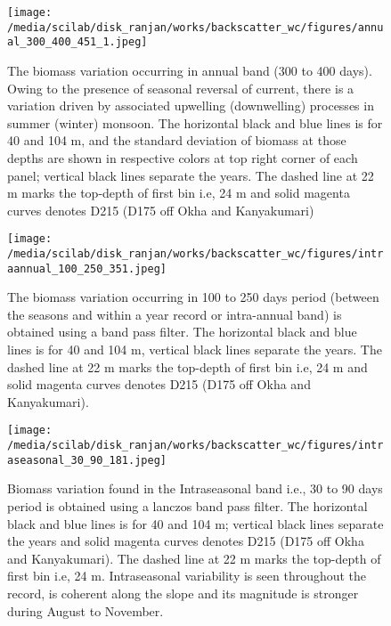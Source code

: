 \documentclass{article}
\begin{document}
\begin{figure}[htbp]
	\centering
	\texttt{[image: /media/scilab/disk\_ranjan/works/backscatter\_wc/figures/annual\_300\_400\_451\_1.jpeg]} 
	\captionsetup{justification=justified,font=footnotesize,skip=0.05\baselineskip,width=\textwidth}
	\caption{The biomass variation occurring in annual band (300 to 400 days). Owing to the presence of seasonal reversal of current, there is a variation driven by associated upwelling (downwelling) processes in summer (winter) monsoon. The horizontal black and blue lines is for 40 and 104 m, and the standard deviation of biomass at those depths are shown in respective colors at top right corner of each panel; vertical black lines separate the years. The dashed line at 22 m marks the top-depth of first bin i.e, 24 m and solid magenta curves denotes D215 (D175 off Okha and Kanyakumari)}
	\label{fig:annual}
\end{figure}



\begin{figure}[htbp]
	\centering
	\texttt{[image: /media/scilab/disk\_ranjan/works/backscatter\_wc/figures/intraannual\_100\_250\_351.jpeg]} 
	\captionsetup{justification=justified,font=footnotesize,skip=0.05\baselineskip,width=\textwidth}
	\caption{The biomass variation occurring in 100 to 250 days period (between the seasons and within a year record or intra-annual band) is obtained using a band pass filter. The horizontal black and blue lines is for 40 and 104 m,
	vertical black lines separate the years. The dashed line at 22 m marks the top-depth of first bin i.e, 24 m and solid magenta curves denotes D215 (D175 off Okha and Kanyakumari). }
	\label{fig:intraannual}
\end{figure}

\begin{figure}[htbp]
	\centering
	\texttt{[image: /media/scilab/disk\_ranjan/works/backscatter\_wc/figures/intraseasonal\_30\_90\_181.jpeg]} 
	\captionsetup{justification=justified,font=footnotesize,skip=0.05\baselineskip,width=\textwidth}
	\caption{Biomass variation found in the Intraseasonal band i.e., 30 to 90 days  period is obtained using a lanczos band pass filter. The horizontal black and blue lines is for 40 and 104 m;
	vertical black lines separate the years and solid magenta curves denotes D215 (D175 off Okha and Kanyakumari). The dashed line at 22 m marks the top-depth of first bin i.e, 24 m. Intraseasonal variability is seen throughout the record, is coherent along the slope and its magnitude is stronger during August to November.}
	\label{fig:intraseasonal}
\end{figure}
\end{document}
